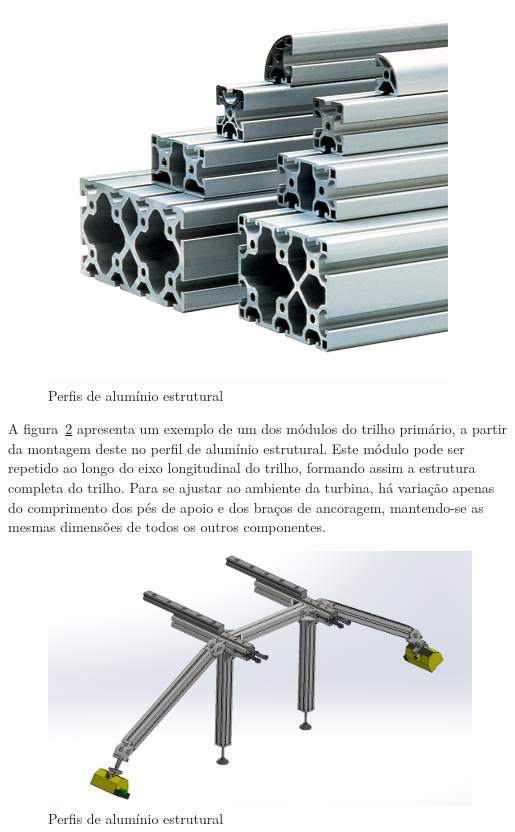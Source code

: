 \begin{figure}[H]
	\centering
	\includegraphics[width=0.7\columnwidth]{figs/construcao/aluminio_estrutural}
	\caption{Perfis de alumínio estrutural}
    \label{fig::aluminio_estrutural}
\end{figure}

A figura~\ref{fig::modulo_primario} apresenta um exemplo de um dos módulos do
trilho primário, a partir da montagem deste no perfil de alumínio
estrutural. Este módulo pode ser repetido ao longo do eixo longitudinal do
trilho, formando assim a estrutura completa do trilho. 
Para se ajustar ao ambiente da turbina, há variação apenas do comprimento dos
pés de apoio e dos braços de ancoragem, mantendo-se as mesmas dimensões de todos
os outros componentes.

\begin{figure}[H]
	\centering
	\includegraphics[width=0.9\columnwidth]{figs/construcao/modulo_primario}
	\caption{Perfis de alumínio estrutural}
    \label{fig::modulo_primario}
\end{figure}

